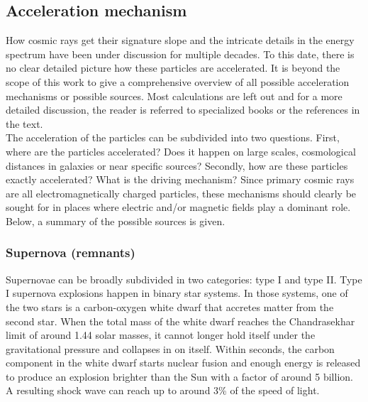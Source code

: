 

\subsection{Acceleration mechanism}
How cosmic rays get their signature slope and the intricate details in the energy spectrum have been under discussion for multiple decades. To this date, there is no clear detailed picture how these particles are accelerated. It is beyond the scope of this work to give a comprehensive overview of all possible acceleration mechanisms or possible sources. Most calculations are left out and for a more detailed discussion, the reader is referred to specialized books or the references in the text.\\
\newline
The acceleration of the particles can be subdivided into two questions. First, where are the particles accelerated? Does it happen on large scales, cosmological distances in galaxies or near specific sources? Secondly, how are these particles exactly accelerated? What is the driving mechanism? Since primary cosmic rays are all electromagnetically charged particles, these mechanisms should clearly be sought for in places where electric and/or magnetic fields play a dominant role. Below, a summary of the possible sources is given.




\subsubsection{Supernova (remnants)}
\label{subsubsec:supernovae}
Supernovae can be broadly subdivided in two categories: type I and type II. Type I supernova explosions happen in binary star systems. In those systems, one of the two stars is a carbon-oxygen white dwarf that accretes matter from the second star. When the total mass of the white dwarf reaches the Chandrasekhar limit of around 1.44 solar masses, it cannot longer hold itself under the gravitational pressure and collapses in on itself. Within seconds, the carbon component in the white dwarf starts nuclear fusion and enough energy is released to produce an explosion brighter than the Sun with a factor of around 5 billion. 
A resulting shock wave can reach up to around 3\% of the speed of light.

